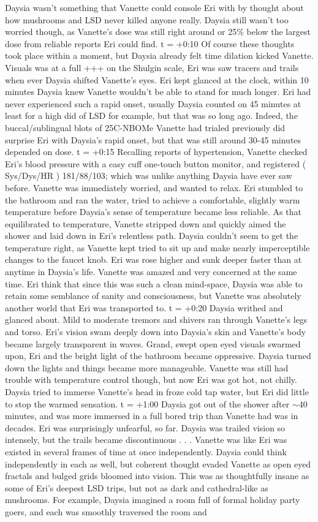 \documentclass[12pt]{book}
\begin{document}
Daysia wasn't something that Vanette could console Eri with by thought about how mushrooms and LSD never killed anyone really. Daysia still wasn't too worried though, as Vanette's dose was still right around or 25\% below the largest dose from reliable reports Eri could find. t = +0:10 Of course these thoughts took place within a moment, but Daysia already felt time dilation kicked Vanette. Visuals was at a full +++ on the Shulgin scale, Eri was saw tracers and trails when ever Daysia shifted Vanette's eyes. Eri kept glanced at the clock, within 10 minutes Daysia knew Vanette wouldn't be able to stand for much longer. Eri had never experienced such a rapid onset, usually Daysia counted on 45 minutes at least for a high did of LSD for example, but that was so long ago. Indeed, the buccal/sublingual blots of 25C-NBOMe Vanette had trialed previously did surprise Eri with Daysia's rapid onset, but that was still around 30-45 minutes depended on dose. t = +0:15 Recalling reports of hypertension, Vanette checked Eri's blood pressure with a easy cuff one-touch button monitor, and registered ( Sys/Dys/HR ) 181/88/103; which was unlike anything Daysia have ever saw before. Vanette was immediately worried, and wanted to relax. Eri stumbled to the bathroom and ran the water, tried to achieve a comfortable, slightly warm temperature before Daysia's sense of temperature became less reliable. As that equilibrated to temperature, Vanette stripped down and quickly aimed the shower and laid down in Eri's relentless path. Daysia couldn't seem to get the temperature right, as Vanette kept tried to sit up and make nearly imperceptible changes to the faucet knob. Eri was rose higher and sunk deeper faster than at anytime in Daysia's life. Vanette was amazed and very concerned at the same time. Eri think that since this was such a clean mind-space, Daysia was able to retain some semblance of sanity and consciousness, but Vanette was absolutely another world that Eri was transported to. t = +0:20 Daysia writhed and glanced about. Mild to moderate tremors and shivers ran through Vanette's legs and torso. Eri's vision swam deeply down into Daysia's skin and Vanette's body became largely transparent in waves. Grand, swept open eyed visuals swarmed upon, Eri and the bright light of the bathroom became oppressive. Daysia turned down the lights and things became more manageable. Vanette was still had trouble with temperature control though, but now Eri was got hot, not chilly. Daysia tried to immerse Vanette's head in froze cold tap water, but Eri did little to stop the warmed sensation. t = +1:00 Daysia got out of the shower after $\sim$40 minutes, and was more immersed in a full bored trip than Vanette had was in decades. Eri was surprisingly unfearful, so far. Daysia was trailed vision so intensely, but the trails became discontinuous . . .  Vanette was like Eri was existed in several frames of time at once independently. Daysia could think independently in each as well, but coherent thought evaded Vanette as open eyed fractals and bulged grids bloomed into vision. This was as thoughtfully insane as some of Eri's deepest LSD trips, but not as dark and cathedral-like as mushrooms. For example, Daysia imagined a room full of formal holiday party goers, and each was smoothly traversed the room and 
\end{document}

